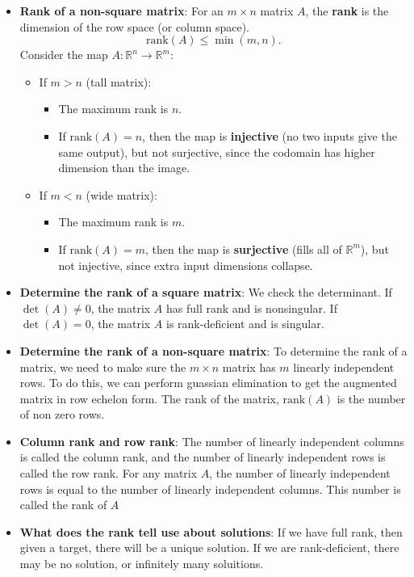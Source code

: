 \documentclass{report}
\begin{document}
\begin{itemize}
        \item \textbf{Rank of a non-square matrix}:
                 For an $m \times n$ matrix $A$, the \textbf{rank} is the dimension of the row space (or column space). 
                    \[
                        \text{rank}(A) \leq \min(m,n).
                    \]
                    Consider the map $A: \mathbb{R}^n \to \mathbb{R}^m$:
                    \begin{itemize}
                        \item If $m > n$ (tall matrix):
                            \begin{itemize}
                                \item The maximum rank is $n$.
                                \item If $\text{rank}(A) = n$, then the map is \textbf{injective} (no two inputs give the same output), but not surjective, since the codomain has higher dimension than the image.
                            \end{itemize}
                        \item If $m < n$ (wide matrix):
                            \begin{itemize}
                                \item The maximum rank is $m$.
                                \item If $\text{rank}(A) = m$, then the map is \textbf{surjective} (fills all of $\mathbb{R}^m$), but not injective, since extra input dimensions collapse.
                            \end{itemize}
                    \end{itemize}
        \item \textbf{Determine the rank of a square matrix}: We check the determinant. If $\det(A) \ne 0$, the matrix $A$ has full rank and is nonsingular. If $\det(A) = 0$, the matrix $A$ is rank-deficient and is singular.
        \item \textbf{Determine the rank of a non-square matrix}: To determine the rank of a matrix, we need to make sure the $m\times n$ matrix has $m$ linearly independent rows. To do this, we can perform guassian elimination to get the augmented matrix in row echelon form. The rank of the matrix, $\text{rank}(A)$ is the number of non zero rows.
        \item \textbf{Column rank and row rank}: The number of linearly independent columns is called the column rank, and the number of linearly independent rows is called the row rank.
            \bigbreak \noindent 
            For any matrix $A$, the number of linearly independent rows is equal to the number of linearly independent columns. This number is called the rank of $A$
        \item \textbf{What does the rank tell use about solutions}: If we have full rank, then given a target, there will be a unique solution. If we are rank-deficient, there may be no solution, or infinitely many soluitions.





\end{itemize}
\end{document}
